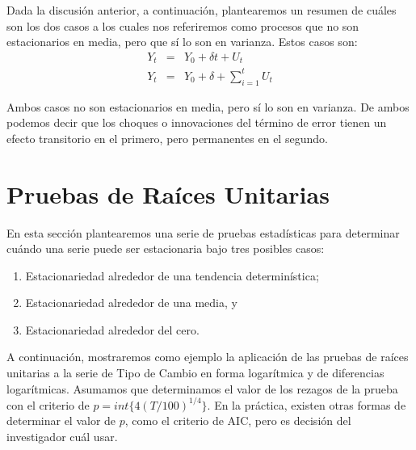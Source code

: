 \documentclass[
]{book}
\begin{document}
Dada la discusión anterior, a continuación, plantearemos un resumen de cuáles son los dos casos a los cuales nos referiremos como procesos que no son estacionarios en media, pero que sí lo son en varianza. Estos casos son:
\begin{eqnarray}
    Y_t & = & Y_0 + \delta t + U_t \\
    Y_t & = & Y_0 + \delta + \sum_{i = 1}^t U_t
\end{eqnarray}

Ambos casos no son estacionarios en media, pero sí lo son en varianza. De ambos podemos decir que los choques o innovaciones del término de error tienen un efecto transitorio en el primero, pero permanentes en el segundo.

\hypertarget{pruebas-de-rauxedces-unitarias}{%
\section{Pruebas de Raíces Unitarias}\label{pruebas-de-rauxedces-unitarias}}

En esta sección plantearemos una serie de pruebas estadísticas para determinar cuándo una serie puede ser estacionaria bajo tres posibles casos:

\begin{enumerate}
\def\labelenumi{\arabic{enumi}.}
\item
  Estacionariedad alrededor de una tendencia determinística;
\item
  Estacionariedad alrededor de una media, y
\item
  Estacionariedad alrededor del cero.
\end{enumerate}

A continuación, mostraremos como ejemplo la aplicación de las pruebas de raíces unitarias a la serie de Tipo de Cambio en forma logarítmica y de diferencias logarítmicas. Asumamos que determinamos el valor de los rezagos de la prueba con el criterio de \(p = int\{ 4 (T/100)^{1/4} \}\). En la práctica, existen otras formas de determinar el valor de \(p\), como el criterio de AIC, pero es decisión del investigador cuál usar.
\end{document}
